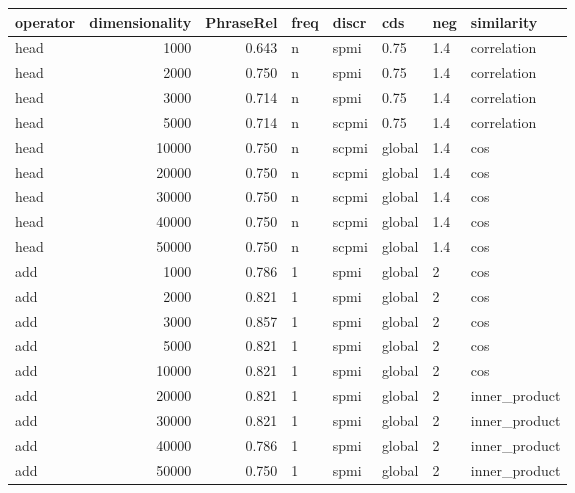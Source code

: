 \begin{tabular}{lrrlllll}
\toprule
operator &  dimensionality &  PhraseRel &  freq &  discr &     cds &  neg &     similarity \\
\midrule
    head &            1000 &      0.643 &     n &   spmi &    0.75 &  1.4 &    correlation \\
    head &            2000 &      0.750 &     n &   spmi &    0.75 &  1.4 &    correlation \\
    head &            3000 &      0.714 &     n &   spmi &    0.75 &  1.4 &    correlation \\
    head &            5000 &      0.714 &     n &  scpmi &    0.75 &  1.4 &    correlation \\
    head &           10000 &      0.750 &     n &  scpmi &  global &  1.4 &            cos \\
    head &           20000 &      0.750 &     n &  scpmi &  global &  1.4 &            cos \\
    head &           30000 &      0.750 &     n &  scpmi &  global &  1.4 &            cos \\
    head &           40000 &      0.750 &     n &  scpmi &  global &  1.4 &            cos \\
    head &           50000 &      0.750 &     n &  scpmi &  global &  1.4 &            cos \\
     add &            1000 &      0.786 &     1 &   spmi &  global &    2 &            cos \\
     add &            2000 &      0.821 &     1 &   spmi &  global &    2 &            cos \\
     add &            3000 &      0.857 &     1 &   spmi &  global &    2 &            cos \\
     add &            5000 &      0.821 &     1 &   spmi &  global &    2 &            cos \\
     add &           10000 &      0.821 &     1 &   spmi &  global &    2 &            cos \\
     add &           20000 &      0.821 &     1 &   spmi &  global &    2 &  inner\_product \\
     add &           30000 &      0.821 &     1 &   spmi &  global &    2 &  inner\_product \\
     add &           40000 &      0.786 &     1 &   spmi &  global &    2 &  inner\_product \\
     add &           50000 &      0.750 &     1 &   spmi &  global &    2 &  inner\_product \\

\end{tabular}
